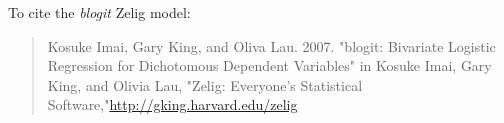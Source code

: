 To cite the \emph{ blogit } Zelig model:
 \begin{verse}
 Kosuke Imai, Gary King, and Oliva Lau. 2007. "blogit: Bivariate Logistic Regression for Dichotomous Dependent Variables" in Kosuke Imai, Gary King, and Olivia Lau, "Zelig: Everyone's Statistical Software,"\url{http://gking.harvard.edu/zelig} 
\end{verse}